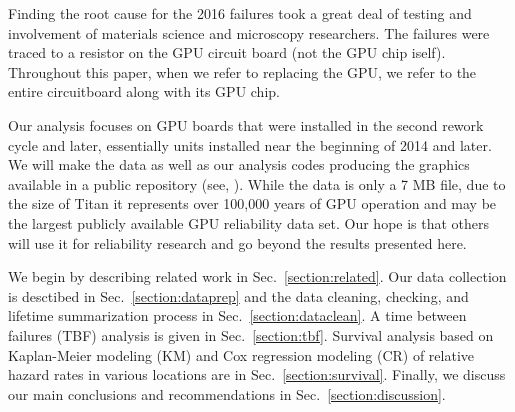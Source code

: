 Finding the root cause for the 2016 failures took a great deal of
testing and involvement of materials science and microscopy
researchers. The failures were traced to a resistor on the GPU
circuit board (not the GPU chip iself). Throughout this paper, when we
refer to replacing the GPU, we refer to the entire circuitboard along
with its GPU chip.

Our analysis focuses on GPU boards that were installed in the second
rework cycle and later, essentially units installed near the beginning
of 2014 and later. We will make the data as well as our analysis codes
producing the graphics available in a public repository (see,
\cite[repository]{repositoryreference}).  While the data is only a 7 MB
file, due to the size of Titan it represents over 100,000 years of GPU
operation and may be the largest publicly available GPU reliability
data set. Our hope is that others will use it for reliability research
and go beyond the results presented here.

We begin by describing related work in Sec.~\ref{section:related}. Our
data collection is desctibed in Sec.~\ref{section:dataprep} and the
data cleaning, checking, and lifetime summarization process in
Sec.~\ref{section:dataclean}. A time between failures (TBF) analysis
is given in Sec.~\ref{section:tbf}. Survival analysis based on
Kaplan-Meier modeling (KM) and Cox regression modeling (CR) of
relative hazard rates in various locations are in
Sec.~\ref{section:survival}. Finally, we discuss our main conclusions
and recommendations in Sec.~\ref{section:discussion}.
 


